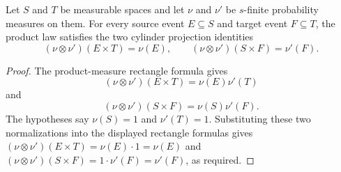 \begin{lemma}
Let \(S\) and \(T\) be measurable spaces and let \(\nu\) and \(\nu'\) be
\(s\)-finite probability measures on them.  For every source event
\(E\subseteq S\) and target event \(F\subseteq T\), the
product law satisfies the two cylinder projection identities
\[
(\nu\otimes\nu')(E\times T)=\nu(E),\qquad
(\nu\otimes\nu')(S\times F)=\nu'(F).
\]
\end{lemma}
\begin{proof}
The product-measure rectangle formula gives
\[
(\nu\otimes\nu')(E\times T)=\nu(E)\nu'(T)
\]
and
\[
(\nu\otimes\nu')(S\times F)=\nu(S)\nu'(F).
\]
The hypotheses say \(\nu(S)=1\) and \(\nu'(T)=1\).  Substituting these two
normalizations into the displayed rectangle formulas gives
\((\nu\otimes\nu')(E\times T)=\nu(E)\cdot 1=\nu(E)\) and
\((\nu\otimes\nu')(S\times F)=1\cdot\nu'(F)=\nu'(F)\), as required.
\end{proof}
